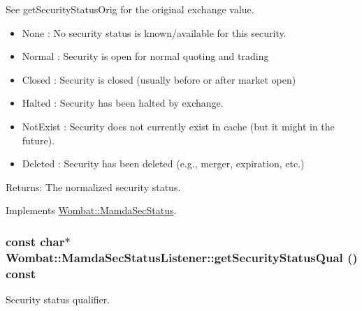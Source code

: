 See get\-Security\-Status\-Orig for the original exchange value.

\begin{itemize}
\item None : No security status is known/available for this security. \item Normal : Security is open for normal quoting and trading \item Closed : Security is closed (usually before or after market open) \item Halted : Security has been halted by exchange. \item Not\-Exist : Security does not currently exist in cache (but it might in the future). \item Deleted : Security has been deleted (e.g., merger, expiration, etc.)  \end{itemize}


\begin{Desc}
\item[Returns:]The normalized security status. \end{Desc}


Implements \hyperlink{classWombat_1_1MamdaSecStatus_ea108ad9235e4c39c8f5474cbb6c003f}{Wombat::Mamda\-Sec\-Status}.\hypertarget{classWombat_1_1MamdaSecStatusListener_c94de1b4d8e9377a219ce488fa7ef16c}{
\subsubsection[getSecurityStatusQual]{\setlength{\rightskip}{0pt plus 5cm}const char$\ast$ Wombat::Mamda\-Sec\-Status\-Listener::get\-Security\-Status\-Qual () const}}
\label{classWombat_1_1MamdaSecStatusListener_c94de1b4d8e9377a219ce488fa7ef16c}


Security status qualifier. 

